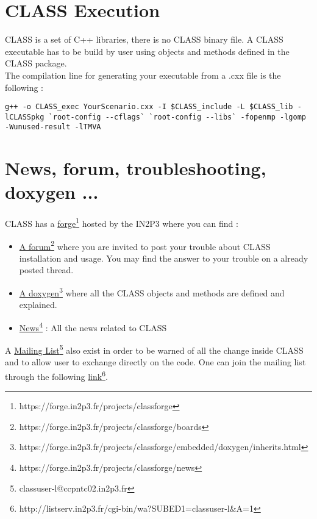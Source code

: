 \chapter{CLASS Execution}
CLASS is a set of C++ libraries, there is no CLASS binary file. A CLASS executable has to be build by user using objects and methods defined in the CLASS package. \\
The compilation line for generating your executable from a .cxx file is the following :

\begin{center}
\begin{minipage}{\textwidth}
\begin{lstlisting}[style=terminal]
g++ -o CLASS_exec YourScenario.cxx -I $CLASS_include -L $CLASS_lib -lCLASSpkg `root-config --cflags` `root-config --libs` -fopenmp -lgomp -Wunused-result -lTMVA
\end{lstlisting}
\end{minipage}
\end{center}

\chapter{News, forum, troubleshooting, doxygen ...}
CLASS has a \href{https://forge.in2p3.fr/projects/classforge}{forge}\footnote{https://forge.in2p3.fr/projects/classforge} hosted by the IN2P3  where you can find :

\begin{itemize}
\item \href{https://forge.in2p3.fr/projects/classforge/boards}{A forum}\footnote{https://forge.in2p3.fr/projects/classforge/boards} where you are invited to post your trouble about CLASS installation and usage. You may find the answer to your trouble on a already posted thread.
\item \href{https://forge.in2p3.fr/projects/classforge/embedded/doxygen/inherits.html}{A doxygen}\footnote{https://forge.in2p3.fr/projects/classforge/embedded/doxygen/inherits.html} where all the CLASS objects and methods are defined and explained.
\item \href{https://forge.in2p3.fr/projects/classforge/news}{News}\footnote{https://forge.in2p3.fr/projects/classforge/news} : All the news related to CLASS
\end{itemize}
A \href{classuser-l@ccpntc02.in2p3.fr}{Mailing List}\footnote{classuser-l@ccpntc02.in2p3.fr} also exist in order to be warned of all the change inside CLASS and to allow user to exchange directly on the code. One can join the mailing list through the following  \href{http://listserv.in2p3.fr/cgi-bin/wa?SUBED1=classuser-l&A=1}{link}\footnote{http://listserv.in2p3.fr/cgi-bin/wa?SUBED1=classuser-l\&A=1}.